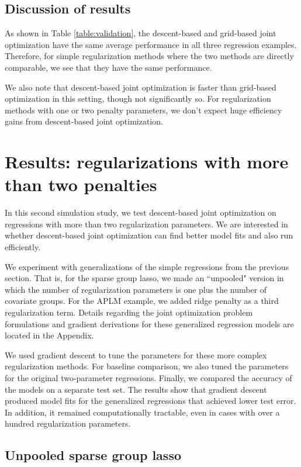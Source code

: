 \documentclass[10pt,letterpaper]{article}
\begin{document}
\subsection{Discussion of results}

As shown in Table \ref{table:validation}, the descent-based and grid-based joint optimization have the same average performance in all three regression examples. Therefore, for simple regularization methods where the two methods are directly comparable, we see that they have the same performance.

We also note that descent-based joint optimization is faster than grid-based optimization in this setting, though not significantly so. For regularization methods with one or two penalty parameters, we don't expect huge efficiency gains from descent-based joint optimization.

\section{Results: regularizations with more than two penalties}

In this second simulation study, we test descent-based joint optimization on regressions with more than two regularization parameters. We are interested in whether descent-based joint optimization can find better model fits and also run efficiently.

We experiment with generalizations of the simple regressions from the previous section. That is, for the sparse group lasso, we made an ``unpooled" version in which the number of regularization parameters is one plus the number of covariate groups. For the APLM example, we added ridge penalty as a third regularization term. Details regarding the joint optimization problem formulations and gradient derivations for these generalized regression models are located in the Appendix.

We used gradient descent to tune the parameters for these more complex regularization methods. For baseline comparison, we also tuned the parameters for the original two-parameter regressions. Finally, we compared the accuracy of the models on a separate test set. The results show that gradient descent produced model fits for the generalized regressions that achieved lower test error. In addition, it remained computationally tractable, even in cases with over a hundred regularization parameters.

\subsection{Unpooled sparse group lasso}
\end{document}
